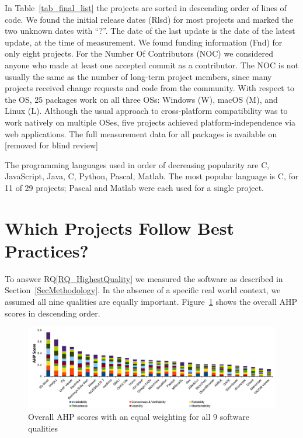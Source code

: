 \documentclass[final, 12pt, 3p, times]{elsarticle}
\newcommand{\rqref}[1]{RQ\ref{#1}}
\newcommand{\CC}{C\nolinebreak\hspace{-.05em}\raisebox{.4ex}{\small\bf
+}\nolinebreak\hspace{-.10em}\raisebox{.4ex}{\small\bf +}}
\begin{document}
In Table~\ref{tab_final_list} the projects are sorted in descending order of
lines of code.  We found the initial release dates (Rlsd) for most projects and
marked the two unknown dates with ``?''. The date of the last update is the date
of the latest update, at the time of measurement. We found funding information
(Fnd) for only eight projects.  For the Number Of Contributors (NOC) we
considered anyone who made at least one accepted commit as a contributor. The
NOC is not usually the same as the number of long-term project members, since
many projects received change requests and code from the community.  With
respect to the OS, 25 packages work on all three OSs: Windows (W), macOS (M),
and Linux (L). Although the usual approach to cross-platform compatibility was
to work natively on multiple OSes, five projects achieved platform-independence
via web applications. The full measurement data for all packages is available on
[removed for blind review]

The programming languages used in order of decreasing popularity are \CC,
JavaScript, Java, C, Python, Pascal, Matlab.  The most popular language is \CC,
for 11 of 29 projects; Pascal and Matlab were each used for a single project.

\section{Which Projects Follow Best Practices?} \label{SecMeasurementResults}

To answer \rqref{RQ_HighestQuality} we measured the software as described in
Section~\ref{SecMethodology}.  In the absence of a specific real world context,
we assumed all nine qualities are equally important.
Figure~\ref{fg_overall_scores} shows the overall AHP scores in descending order.

\begin{figure}[!ht]
\includegraphics[scale=0.47]{overall_scores.pdf}
\caption{Overall AHP scores with an equal weighting for all 9 software qualities}

\label{fg_overall_scores}
\end{figure}
\end{document}
